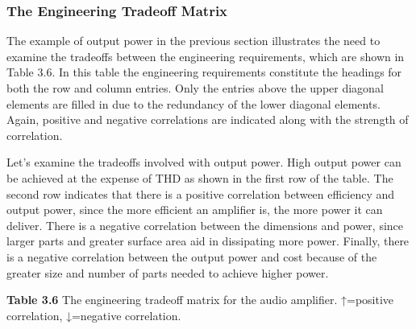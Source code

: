 \subsubsection{The Engineering Tradeoff
Matrix}\label{the-engineering-tradeoff-matrix}

The example of output power in the previous section illustrates the need
to examine the tradeoffs between the engineering requirements, which are
shown in Table 3.6. In this table the engineering requirements
constitute the headings for both the row and column entries. Only the
entries above the upper diagonal elements are filled in due to the
redundancy of the lower diagonal elements. Again, positive and negative
correlations are indicated along with the strength of correlation.

Let's examine the tradeoffs involved with output power. High output
power can be achieved at the expense of THD as shown in the first row of
the table. The second row indicates that there is a positive correlation
between efficiency and output power, since the more efficient an
amplifier is, the more power it can deliver. There is a negative
correlation between the dimensions and power, since larger parts and
greater surface area aid in dissipating more power. Finally, there is a
negative correlation between the output power and cost because of the
greater size and number of parts needed to achieve higher power.

\textbf{Table 3.6} The engineering tradeoff matrix for the audio
amplifier. ↑=positive correlation, ↓=negative correlation.


